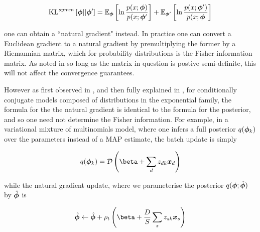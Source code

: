 \begin{align*}
\symmkl{\param}{\param'}
 = \ex{\ln \frac{p(x; \param)}{p(x; \param'}}{\param}
 + \ex{\ln \frac{p(x; \param')}{p(x; \param}}{\param'}
\end{align*}

one can obtain a ``natural gradient" instead. In practice one can convert a Euclidean gradient to a natural gradient by premultiplying the former by a Riemannian matrix, which for probability distributions is the Fisher information matrix. As noted in \cite{Bottou2004} so long as the matrix in question is postive semi-definite, this will not affect the convergence guarantees.

However as first observed in \cite{Hoffman2010}, and then fully explained in \cite{Hoffman2012}, for conditionally conjugate models composed of distributions in the exponential family, the formula for the the natural gradient is identical to the formula for the posterior, and so one need not determine the Fisher information. For example, in a variational mixture of multinomials model, where one infers a full posterior $q(\param_k)$ over the parameters instead of a MAP estimate, the batch update is simply

\begin{align*}
q(\param_k) = \dir{\vv{\beta} + \sum_d z_{dk} \vv{x}_{d}}
\end{align*}

while the natural gradient update, where we parameterise the posterior $q(\param; \hat{\param})$ by $\hat{\param}$ is 

\begin{align}
\hat{\param} \leftarrow \hat{\param} + \rho_t \left(\vv{\beta} + \frac{D}{S} \sum_s z_{sk} \vv{x}_s\right)
\end{align}



